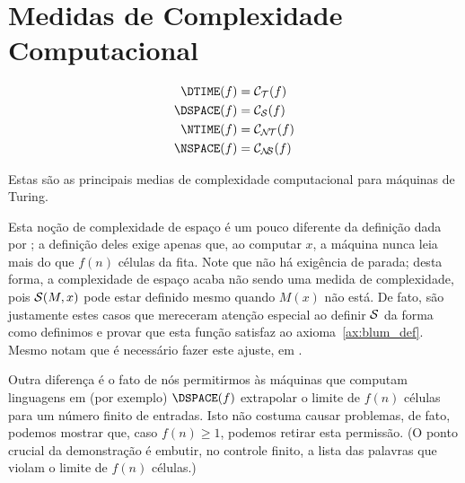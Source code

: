 \section{Medidas de Complexidade Computacional}
\label{sec:default_measures}

\begin{provisionaldefinition}
    \begin{align*}
        \DTIME(f) &= \mathcal C_\PhiDT(f) \\
        \DSPACE(f) &= \mathcal C_\PhiDS(f) \\
        \NTIME(f) &= \mathcal C_\PhiNT(f) \\
        \NSPACE(f) &= \mathcal C_\PhiNS(f)
    \end{align*}
\end{provisionaldefinition}

Estas são as principais medias de complexidade computacional
para máquinas de Turing.

Esta noção de complexidade de espaço
é um pouco diferente da definição dada por
;
a definição deles exige apenas que,
ao computar $x$,
a máquina nunca leia mais do que $f(n)$ células da fita.
Note que não há exigência de parada;
desta forma,
a complexidade de espaço acaba não sendo uma medida de complexidade,
pois ${\mathcal{S}}(M, x)$ pode estar definido
mesmo quando $M(x)$ não está.
De fato,
são justamente estes casos que mereceram
atenção especial ao definir ${\mathcal{S}}$
da forma como definimos
e provar que esta função satisfaz ao axioma~\ref{ax:blum_def}.
Mesmo 
notam que é necessário fazer este ajuste,
em \cite[p.~313]{HopcroftUllman1979}.

Outra diferença é o fato de nós permitirmos
às máquinas que computam linguagens em
(por exemplo) $\DSPACE(f)$
extrapolar o limite de $f(n)$ células
para um número finito de entradas.
Isto não costuma causar problemas,
de fato,
podemos mostrar que,
caso $f(n) \geq 1$,
podemos retirar esta permissão.
(O ponto crucial da demonstração é embutir,
no controle finito,
a lista das palavras que violam o limite de $f(n)$ células.)

